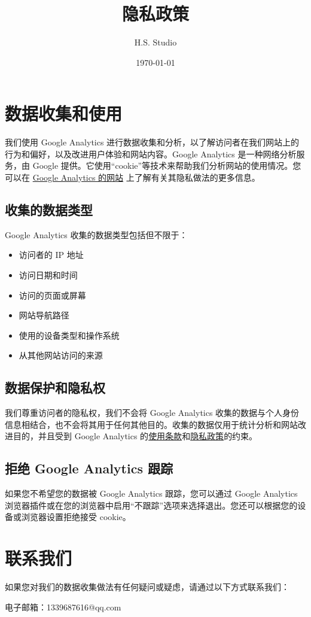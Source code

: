 \documentclass{article}
\title{隐私政策}
\author{H.S. Studio}
\date{\today}
\begin{document}
\maketitle

\section*{数据收集和使用}

我们使用 Google Analytics 进行数据收集和分析，以了解访问者在我们网站上的行为和偏好，以及改进用户体验和网站内容。Google Analytics 是一种网络分析服务，由 Google 提供。它使用“cookie”等技术来帮助我们分析网站的使用情况。您可以在 \href{https://analytics.google.com/analytics/web/}{Google Analytics 的网站} 上了解有关其隐私做法的更多信息。

\subsection*{收集的数据类型}

Google Analytics 收集的数据类型包括但不限于：

\begin{itemize}
    \item 访问者的 IP 地址
    \item 访问日期和时间
    \item 访问的页面或屏幕
    \item 网站导航路径
    \item 使用的设备类型和操作系统
    \item 从其他网站访问的来源
\end{itemize}

\subsection*{数据保护和隐私权}

我们尊重访问者的隐私权，我们不会将 Google Analytics 收集的数据与个人身份信息相结合，也不会将其用于任何其他目的。收集的数据仅用于统计分析和网站改进目的，并且受到 Google Analytics 的\href{https://www.google.com/analytics/terms/}{使用条款}和\href{https://policies.google.com/privacy}{隐私政策}的约束。

\subsection*{拒绝 Google Analytics 跟踪}

如果您不希望您的数据被 Google Analytics 跟踪，您可以通过 Google Analytics 浏览器插件或在您的浏览器中启用“不跟踪”选项来选择退出。您还可以根据您的设备或浏览器设置拒绝接受 cookie。

\section*{联系我们}

如果您对我们的数据收集做法有任何疑问或疑虑，请通过以下方式联系我们：

电子邮箱：1339687616@qq.com
\end{document}

